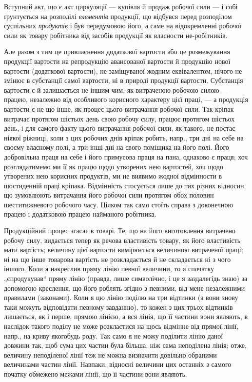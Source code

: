 Вступний акт, що є акт циркуляції — купівля й продаж робочої сили — і
собі ґрунтується на розподілі \emph{елементів} продукції, що відбувся перед
розподілом суспільних \emph{продуктів} і був передумовою його, а саме на
відокремленні робочої сили як товару робітника від засобів продукції
як власности не-робітників.

Але разом з тим це привласнення додаткової вартости або це розмежування
продукції вартости на репродукцію авансованої вартости й
продукцію нової вартости (додаткової вартости), не заміщуваної жодним
еквівалентом, нічого не змінює в субстанції самої вартости, ні в природі
продукції вартости. Субстанція вартости є й залишається не іншим чим,
як витраченою робочою силою — працею, незалежно від особливого корисного
характеру цієї праці, — а продукція вартости є не що інше, як процес
цього витрачання робочої сили. Так кріпак витрачає протягом шістьох
день свою робочу силу, працює протягом шістьох день, і для самого
факту цього витрачання робочої сили, як такого, не постає ніякої ріжниці,
коли з цих робочих днів кріпак робить, напр., три дні на себе на
своєму власному полі, а три інші дні на свого поміщика на його полі.
Його добровільна праця на себе і його примусова праця на пана, однаково
є праця; хоч розглядатимемо ми її як працю щодо утворених нею
вартостей, хоч щодо утворених нею корисних продуктів, ми не виявимо
жодної відмінности в шостиденній праці кріпака. Відмінність стосується
лише до тих різних відносин, що зумовлюють витрачання його робочої
сили протягом обох половин шеститижневого робочого часу. Цілком так
само стоїть справа з доконечною працею і додатковою працею найманого
робітника.

Продукційний процес згасає в товарі. Те, що на його виготовлення
витрачено робочу силу, видається тепер як речова властивість товару, як
його властивість мати вартість; величину цієї вартости вимірюється
величиною витраченої праці; ні на що інше товарова вартість не розкладається
й не складається ні з чого іншого. Коли я накреслив пряму
лінію певної величини, то я спочатку „спродукував“ пряму лінію (правда,
лише символічно, і це я заздалегідь знаю) за допомогою креслення, що
його роблять згідно з певними, від мене незалежними правилами (законами).
Коли я цю лінію поділю на три відтинки (а вони знову таки
можуть відповідати певному завданню), то кожен з цих трьох відтинків
лишається, як і перше, прямою лінією, а вся лінія, що її частини вони
являють, в наслідок такого поділу не може розкластися на щось відмінне
від прямої лінії, напр., на криву якогобудь роду. Так само я не можу
поділити лінію даної довжини так, щоб сума цих частин була більша,
ніж сама неподілена лінія; отже, величину неподіленої лінії теж не можна
визначити довільно обраними величинами частин лінії. Навпаки, відносні
величини цих останніх з самого початку обмежено межами лінії, що її
частини вони являють.

